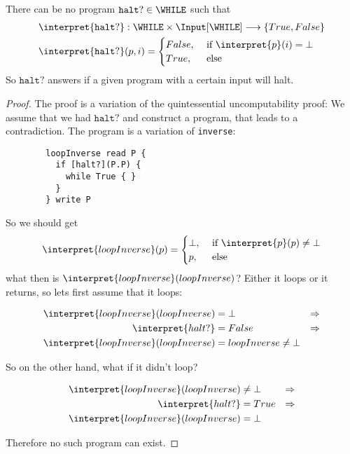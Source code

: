 \begin{theorem}
	There can be no program $\mathtt{halt?}\in \WHILE$ such that 
	\begin{align*}
		\interpret{\mathtt{halt?}}&:\WHILE\times \Input[\WHILE] \longrightarrow \{True, False\}\\
		\interpret{\mathtt{halt?}}&(p, i) =\begin{cases}
			False, &\text{ if }\interpret{p}(i)=\bot\\
			True, &\text{ else}
		\end{cases}
	\end{align*}
	So $\mathtt{halt?}$ answers if a given program with a certain input will halt.
\end{theorem}
\begin{proof}
	The proof is a variation of the quintessential uncomputability proof: We 
	assume that we had $\mathtt{halt?}$ and construct a program, that leads to a
	contradiction. The program is a variation of {\tt inverse}:

	\begin{verbatim}
		loopInverse read P {
		  if [halt?](P.P) {
		    while True { }
		  }
		} write P
	\end{verbatim}

	So we should get
	\begin{equation*}
	 \interpret{loopInverse}(p) = \begin{cases}
			\bot, &\text{ if }\interpret{p}(p) \neq \bot\\
			p,& \text{ else} 
		\end{cases}
	\end{equation*}
	what then is $\interpret{loopInverse}(loopInverse)$? Either it loops or it 
	returns, so lets first assume that it loops:

	\begin{align*}
		\interpret{loopInverse}(loopInverse) &= \bot &\Rightarrow \\ 
		\interpret{halt?} &= False &\Rightarrow \\ 
		\interpret{loopInverse}(loopInverse) &= loopInverse\neq \bot
	\end{align*}

	So on the other hand, what if it didn't loop?

	\begin{align*}
		\interpret{loopInverse}(loopInverse) &\neq\bot &\Rightarrow \\
		\interpret{halt?} &= True & \Rightarrow \\
		\interpret{loopInverse}(loopInverse) &= \bot
	\end{align*}

	Therefore no such \WHILE program can exist.
\end{proof}

